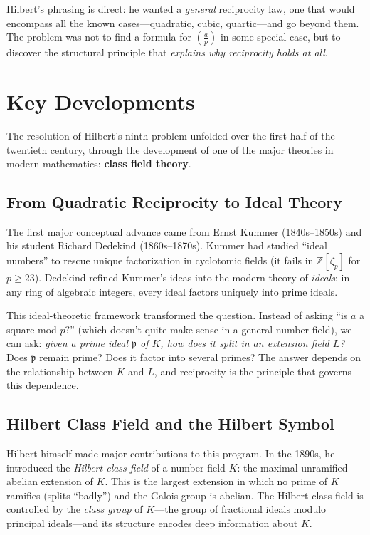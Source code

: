 Hilbert's phrasing is direct: he wanted a \emph{general} reciprocity law, one that would encompass all the known cases---quadratic, cubic, quartic---and go beyond them. The problem was not to find a formula for $\left(\frac{a}{p}\right)$ in some special case, but to discover the structural principle that \emph{explains why reciprocity holds at all}.

\section{Key Developments}

The resolution of Hilbert's ninth problem unfolded over the first half of the twentieth century, through the development of one of the major theories in modern mathematics: \textbf{class field theory}.

\subsection{From Quadratic Reciprocity to Ideal Theory}

The first major conceptual advance came from Ernst Kummer (1840s--1850s) and his student Richard Dedekind (1860s--1870s). Kummer had studied ``ideal numbers'' to rescue unique factorization in cyclotomic fields (it fails in $\mathbb{Z}[\zeta_p]$ for $p \geq 23$). Dedekind refined Kummer's ideas into the modern theory of \emph{ideals}: in any ring of algebraic integers, every ideal factors uniquely into prime ideals.

This ideal-theoretic framework transformed the question. Instead of asking ``is $a$ a square mod $p$?'' (which doesn't quite make sense in a general number field), we can ask: \emph{given a prime ideal $\mathfrak{p}$ of $K$, how does it split in an extension field $L$?} Does $\mathfrak{p}$ remain prime? Does it factor into several primes? The answer depends on the relationship between $K$ and $L$, and reciprocity is the principle that governs this dependence.

\subsection{Hilbert Class Field and the Hilbert Symbol}

Hilbert himself made major contributions to this program. In the 1890s, he introduced the \emph{Hilbert class field} of a number field $K$: the maximal unramified abelian extension of $K$. This is the largest extension in which no prime of $K$ ramifies (splits ``badly'') and the Galois group is abelian. The Hilbert class field is controlled by the \emph{class group} of $K$---the group of fractional ideals modulo principal ideals---and its structure encodes deep information about $K$.

